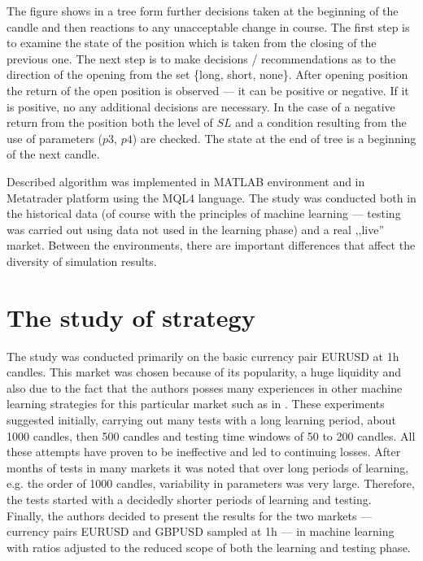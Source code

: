 \documentclass[runningheads,a4paper]{llncs}
\begin{document}
The figure shows in a tree form further decisions taken at the beginning of the candle and then reactions to any unacceptable change in course. The first step is to examine the state of the position which is taken from the closing of the previous one. The next step is to make decisions / recommendations as to the direction of the opening from the set \{long, short, none\}. After opening position  the return of the open position is observed --- it can be positive or negative. If it is positive, no any additional decisions are necessary. In the case of a negative return from the position both the level of $SL$ and a condition resulting from the use of parameters ($p3$, $p4$) are checked. The state at the end of tree is a beginning of the next candle.

Described algorithm was implemented in MATLAB environment and in Metatrader platform using the MQL4 language. The study was conducted both in the historical data (of course with the principles of machine learning --- testing was carried out using data not used in the learning phase) and a real ,,live'' market. Between the environments, there are important differences that affect the diversity of simulation results.

\section{The study of strategy}
The study was conducted primarily on the basic currency pair EURUSD at 1h candles. This market was chosen because of its popularity, a huge liquidity and also due to the fact that the authors posses many experiences in other machine learning strategies for this particular market such as in \cite{Wilinski2014,Wilinski}. These experiments suggested initially, carrying out many tests with a long learning period, about 1000 candles, then 500 candles and testing time windows of 50 to 200 candles. All these attempts have proven to be ineffective and led to continuing losses. After months of tests in many markets it was noted that over long periods of learning, e.g. the order of 1000 candles, variability in parameters was very large. Therefore, the tests started with a decidedly shorter periods of learning and testing.\\

Finally, the authors decided to present the results for the two markets --- currency pairs EURUSD and GBPUSD sampled at 1h --- in machine learning with ratios adjusted to the reduced scope of both the learning and testing phase.\\
\end{document}
